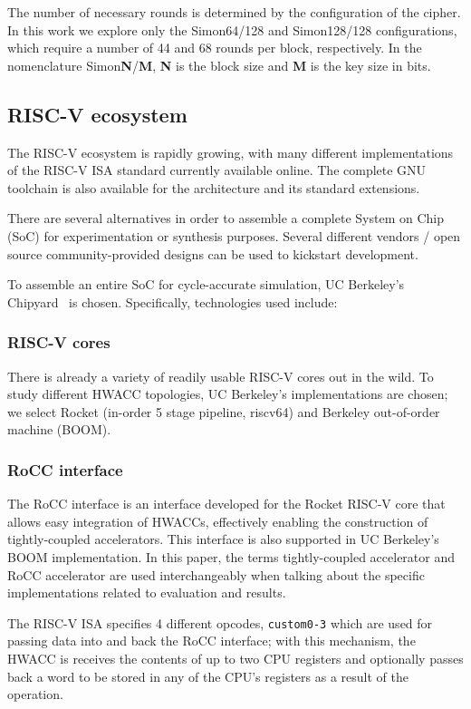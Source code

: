 \documentclass[10pt,conference]{IEEEtran}
\begin{document}
The number of necessary rounds is determined by the configuration of the cipher.
In this work we explore only the Simon64/128 and Simon128/128 configurations,
which require a number of 44 and 68 rounds per block, respectively.
In the nomenclature Simon\textbf{N}/\textbf{M}, \textbf{N} is the block size and
\textbf{M} is the key size in bits.

\subsection{RISC-V ecosystem}

The RISC-V ecosystem is rapidly growing, with many different implementations of
the RISC-V ISA standard currently available online. The complete GNU toolchain
is also available for the architecture and its standard extensions.

There are several alternatives in order to assemble a complete System on Chip
(SoC) for experimentation or synthesis purposes. Several different vendors /
open source community-provided designs can be used to kickstart development.

To assemble an entire SoC for cycle-accurate simulation, UC Berkeley's Chipyard~\cite{Chipyard}
is chosen. Specifically, technologies used include:

\subsubsection{RISC-V cores}

There is already a variety of readily usable RISC-V cores out in the wild. To
study different HWACC topologies, UC Berkeley's implementations are chosen; we
select Rocket (in-order 5 stage pipeline, riscv64) and Berkeley out-of-order
machine (BOOM).

\subsubsection{RoCC interface}

The RoCC interface is an interface developed for the Rocket RISC-V core that
allows easy integration of HWACCs, effectively enabling the construction of
tightly-coupled accelerators. This interface is also supported in UC Berkeley's
BOOM implementation. In this paper, the terms tightly-coupled accelerator and
RoCC accelerator are used interchangeably when talking about the specific
implementations related to evaluation and results.

The RISC-V ISA specifies 4 different opcodes, \texttt{custom0-3} which are used for passing data
into and back the RoCC interface; with this mechanism, the HWACC is receives the
contents of up to two CPU registers and optionally passes back a word to be stored in any of
the CPU's registers as a result of the operation.
\end{document}
